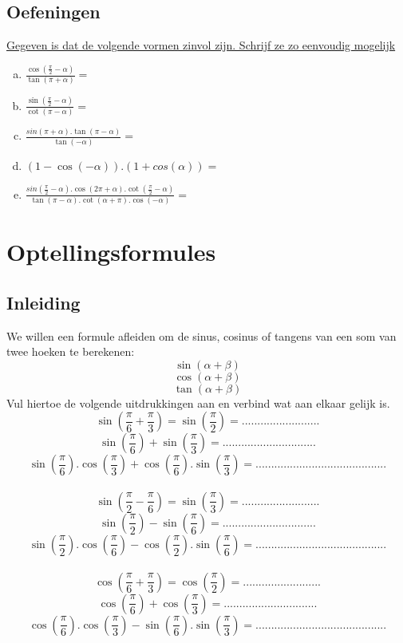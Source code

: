 \documentclass[a4paper,12pt]{article}
\begin{document}
\newpage
\subsection{Oefeningen}
\underline{Gegeven is dat de volgende vormen zinvol zijn. Schrijf ze zo eenvoudig mogelijk}

\begin{enumerate}[(a)]
  \item $\frac{\cos(\frac{\pi}{2}-\alpha)}{\tan(\pi+\alpha)}=$ 
  \item $\frac{\sin(\frac{\pi}{2}-\alpha)}{\cot(\pi-\alpha)}=$ 
  \item $\frac{sin(\pi+\alpha).\tan(\pi-\alpha)}{\tan(-\alpha)}=$ 
  \item $(1-\cos(-\alpha)).(1+cos(\alpha))=$ 
  \item $\frac{sin(\frac{\pi}{2}-\alpha).\cos(2\pi+\alpha).\cot(\frac{\pi}{2}-\alpha)}{\tan(\pi-\alpha).\cot(\alpha+\pi).\cos(-\alpha)}=$ 
\end{enumerate}

\newpage
\section{Optellingsformules}

\subsection{Inleiding}
We willen een formule afleiden om de sinus, cosinus of tangens van een som van twee hoeken te berekenen: 
\[\sin(\alpha + \beta)
\]
\[\cos(\alpha + \beta)
\]
\[\tan(\alpha+\beta)
\]
Vul hiertoe de volgende uitdrukkingen aan en verbind wat aan elkaar gelijk is.
\[\sin(\frac{\pi}{6} + \frac{\pi}{3})=\sin(\frac{\pi}{2})=.........................
\]
\[\sin(\frac{\pi}{6}) + \sin(\frac{\pi}{3})=..............................
\]
\[\sin(\frac{\pi}{6}).\cos(\frac{\pi}{3})+\cos(\frac{\pi}{6}).\sin(\frac{\pi}{3})=..........................................
\]
\paragraph{}
\[\sin(\frac{\pi}{2} - \frac{\pi}{6})=\sin(\frac{\pi}{3})=.........................
\]
\[\sin(\frac{\pi}{2}) - \sin(\frac{\pi}{6})=..............................
\]
\[\sin(\frac{\pi}{2}).\cos(\frac{\pi}{6})-\cos(\frac{\pi}{2}).\sin(\frac{\pi}{6})=..........................................
\]
\paragraph{}
\[\cos(\frac{\pi}{6} + \frac{\pi}{3})=\cos(\frac{\pi}{2})=.........................
\]
\[\cos(\frac{\pi}{6}) + \cos(\frac{\pi}{3})=..............................
\]
\[\cos(\frac{\pi}{6}).\cos(\frac{\pi}{3}) - \sin(\frac{\pi}{6}).\sin(\frac{\pi}{3})=..........................................
\]
\end{document}
